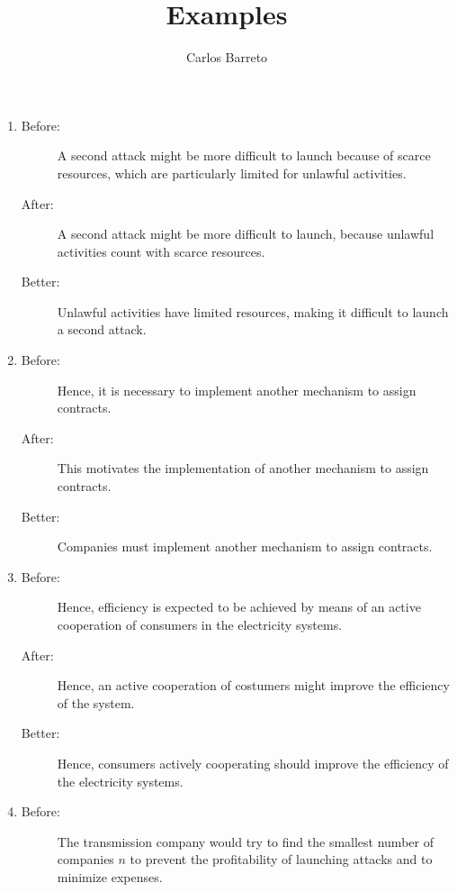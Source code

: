 \documentclass[a4paper,10pt]{article}
\title{Examples}
\author{Carlos Barreto}
\begin{document}
\maketitle



\begin{enumerate}
 \item 
\begin{description}
 \item[Before:] A second attack might be more difficult to launch because of scarce resources, which are particularly limited for unlawful activities. 
 
 \item[After:] A second attack might be more difficult to launch, because unlawful activities count with scarce resources.
 
 \item[Better:] Unlawful activities have limited resources, making it difficult to launch a second attack.
\end{description}


\item
\begin{description}
 \item[Before:] Hence, it is necessary to implement another mechanism to assign contracts.
 
 \item[After:] This motivates the implementation of another mechanism to assign contracts.
 
 \item[Better:] Companies must implement another mechanism to assign contracts.
\end{description}


\item
\begin{description}
 \item[Before:]  Hence, efficiency is expected to be achieved by means of an active
cooperation of consumers in the electricity systems.
 
 \item[After:] Hence, an active cooperation of costumers might improve the efficiency of the system.
 
 \item[Better:] Hence, consumers actively cooperating should improve the efficiency of the electricity systems.
\end{description}


\item
\begin{description}
 \item[Before:] The transmission company would try to find the smallest number of companies $n$ to prevent the profitability of launching attacks and to minimize expenses.
  

\end{description}
\end{enumerate}
\end{document}
